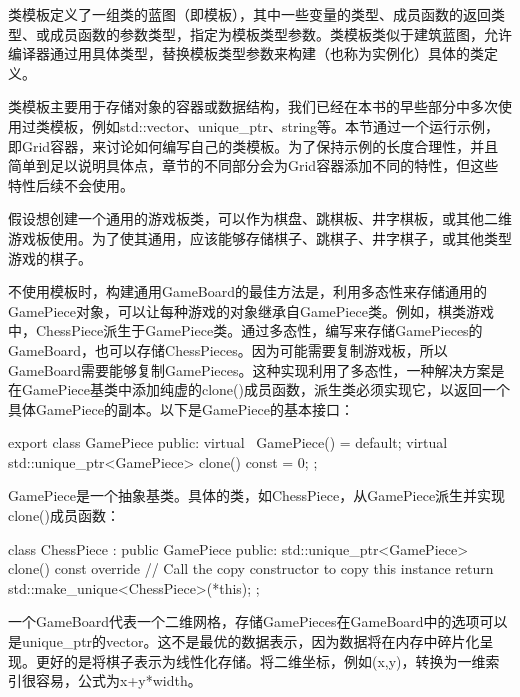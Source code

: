 
类模板定义了一组类的蓝图（即模板），其中一些变量的类型、成员函数的返回类型、或成员函数的参数类型，指定为模板类型参数。类模板类似于建筑蓝图，允许编译器通过用具体类型，替换模板类型参数来构建（也称为实例化）具体的类定义。

类模板主要用于存储对象的容器或数据结构，我们已经在本书的早些部分中多次使用过类模板，例如std::vector、unique\_ptr、string等。本节通过一个运行示例，即Grid容器，来讨论如何编写自己的类模板。为了保持示例的长度合理性，并且简单到足以说明具体点，章节的不同部分会为Grid容器添加不同的特性，但这些特性后续不会使用。


假设想创建一个通用的游戏板类，可以作为棋盘、跳棋板、井字棋板，或其他二维游戏板使用。为了使其通用，应该能够存储棋子、跳棋子、井字棋子，或其他类型游戏的棋子。


不使用模板时，构建通用GameBoard的最佳方法是，利用多态性来存储通用的GamePiece对象，可以让每种游戏的对象继承自GamePiece类。例如，棋类游戏中，ChessPiece派生于GamePiece类。通过多态性，编写来存储GamePieces的GameBoard，也可以存储ChessPieces。因为可能需要复制游戏板，所以GameBoard需要能够复制GamePieces。这种实现利用了多态性，一种解决方案是在GamePiece基类中添加纯虚的clone()成员函数，派生类必须实现它，以返回一个具体GamePiece的副本。以下是GamePiece的基本接口：

\begin{cpp}
export class GamePiece
{
    public:
        virtual ~GamePiece() = default;
        virtual std::unique_ptr<GamePiece> clone() const = 0;
};
\end{cpp}

GamePiece是一个抽象基类。具体的类，如ChessPiece，从GamePiece派生并实现clone()成员函数：

\begin{cpp}
class ChessPiece : public GamePiece
{
    public:
        std::unique_ptr<GamePiece> clone() const override
        {
            // Call the copy constructor to copy this instance
            return std::make_unique<ChessPiece>(*this);
        }
};
\end{cpp}

一个GameBoard代表一个二维网格，存储GamePieces在GameBoard中的选项可以是unique\_ptr的vector。这不是最优的数据表示，因为数据将在内存中碎片化呈现。更好的是将棋子表示为线性化存储。将二维坐标，例如(x,y)，转换为一维索引很容易，公式为x+y*width。

